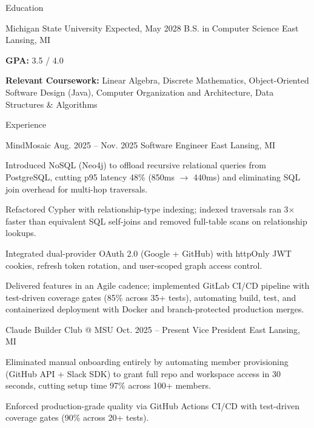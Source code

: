 \documentclass[
	11pt
]{../../../resume}
\begin{document}
	\begin{rSection}{E}{ducation}
		\begin{rSectionEntry}
			{Michigan State University}
			{Expected, May 2028}
			{B.S. in Computer Science}
			{}
			{East Lansing, MI}

			\item \textbf{GPA:} 3.5 / 4.0
			\item \textbf{Relevant Coursework:} Linear Algebra, Discrete Mathematics, Object-Oriented Software Design (Java), Computer Organization and Architecture, Data Structures \& Algorithms
		\end{rSectionEntry}
	\end{rSection}

	\begin{rSection}{E}{xperience}
		\begin{rSectionEntry}
			{MindMosaic}
			{Aug. 2025 -- Nov. 2025}
			{Software Engineer}
			{}
			{East Lansing, MI}

			\item Introduced NoSQL (Neo4j) to offload recursive relational queries from PostgreSQL, cutting p95 latency 48\% (850ms $\rightarrow$ 440ms) and eliminating SQL join overhead for multi-hop traversals.
			\item Refactored Cypher with relationship-type indexing; indexed traversals ran 3$\times$ faster than equivalent SQL self-joins and removed full-table scans on relationship lookups.
			\item Integrated dual-provider OAuth 2.0 (Google + GitHub) with httpOnly JWT cookies, refresh token rotation, and user-scoped graph access control.
			\item Delivered features in an Agile cadence; implemented GitLab CI/CD pipeline with test-driven coverage gates (85\% across 35+ tests), automating build, test, and containerized deployment with Docker and branch-protected production merges.
		\end{rSectionEntry}

		\begin{rSectionEntry}
			{Claude Builder Club @ MSU}
			{Oct. 2025 -- Present}
			{Vice President}
			{}
			{East Lansing, MI}

			\item Eliminated manual onboarding entirely by automating member provisioning (GitHub API + Slack SDK) to grant full repo and workspace access in 30 seconds, cutting setup time 97\% across 100+ members.
			\item Enforced production-grade quality via GitHub Actions CI/CD with test-driven coverage gates (90\% across 20+ tests).
		\end{rSectionEntry}
	\end{rSection}
\end{document}
